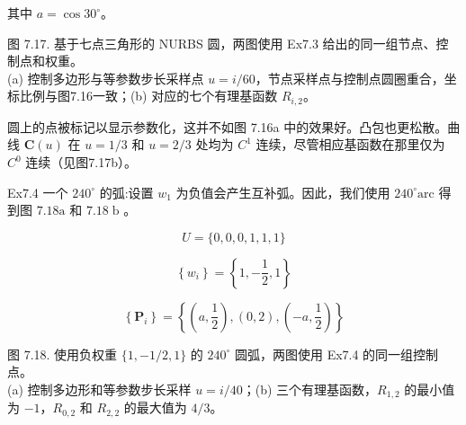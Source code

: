 \documentclass[../main.tex]{subfiles}
\begin{document}
其中 \(a = \cos {30}^{ \circ  }\)。

\begin{center}
\begin{minipage}{36cm}
\vspace*{.6\baselineskip}
\centering
\begin{minipage}{19.5cm}\centering
{}
\end{minipage}\hfill
\begin{minipage}{14cm}\centering
{}
\end{minipage}
\par\smallskip
图 7.17. 基于七点三角形的 NURBS 圆，两图使用 Ex7.3 给出的同一组节点、控制点和权重。\\
(a) 控制多边形与等参数步长采样点 $u=i/60$，节点采样点与控制点圆圈重合，坐标比例与图7.16一致；(b) 对应的七个有理基函数 $R_{i,2}$。
\end{minipage}
\end{center}

圆上的点被标记以显示参数化，这并不如图 7.16a 中的效果好。凸包也更松散。曲线 \(\mathbf C(u)\) 在 \(u=1/3\) 和 \(u=2/3\) 处均为 \(C^1\) 连续，尽管相应基函数在那里仅为 \(C^0\) 连续（见图7.17b）。

Ex7.4 一个 \({240}^{ \circ  }\) 的弧:设置 \({w}_{1}\) 为负值会产生互补弧。因此，我们使用 \({240}^{ \circ  }\mathrm{{arc}}\) 得到图 \({7.18}\mathrm{a}\) 和 \({7.18}\mathrm{\;b}\) 。

\[
U = \{ 0,0,0,1,1,1\}
\]

\[
\left\{  {w}_{i}\right\}   = \left\{  {1, - \frac{1}{2},1}\right\}
\]

\[
\left\{  {\mathbf{P}}_{i}\right\}   = \left\{  {\left( {a,\frac{1}{2}}\right) ,\left( {0,2}\right) ,\left( {-a,\frac{1}{2}}\right) }\right\}
\]

\begin{center}
\begin{minipage}{30cm}
\vspace*{.6\baselineskip}
\centering
\begin{minipage}{14cm}\centering
{}
\end{minipage}\hfill
\begin{minipage}{14cm}\centering
{}
\end{minipage}
\par\smallskip
图 7.18. 使用负权重 $\{1,-1/2,1\}$ 的 $240^\circ$ 圆弧，两图使用 Ex7.4 的同一组控制点。\\
(a) 控制多边形和等参数步长采样 $u=i/40$；(b) 三个有理基函数，$R_{1,2}$ 的最小值为 $-1$，$R_{0,2}$ 和 $R_{2,2}$ 的最大值为 $4/3$。
\end{minipage}
\end{center}
\end{document}
